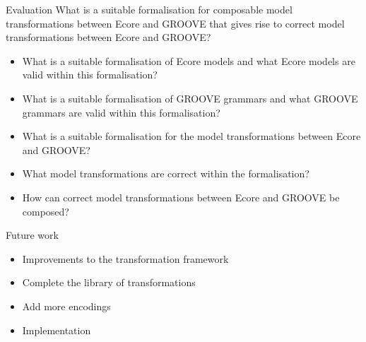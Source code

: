 \begin{frame}{Evaluation}
    What is a suitable formalisation for composable model transformations between Ecore and GROOVE that gives rise to correct model transformations between Ecore and GROOVE?
    \pause
    \begin{itemize}
        \item What is a suitable formalisation of Ecore models and what Ecore models are valid within this formalisation? 
        \item What is a suitable formalisation of GROOVE grammars and what GROOVE grammars are valid within this formalisation?
        \item What is a suitable formalisation for the model transformations between Ecore and GROOVE?
        \item What model transformations are correct within the formalisation?
        \item How can correct model transformations between Ecore and GROOVE be composed?
    \end{itemize}
\end{frame}


\begin{frame}{Future work}
    \begin{itemize}
        \item Improvements to the transformation framework
        \item Complete the library of transformations
        \item Add more encodings
        \item Implementation
    \end{itemize}
\end{frame}


